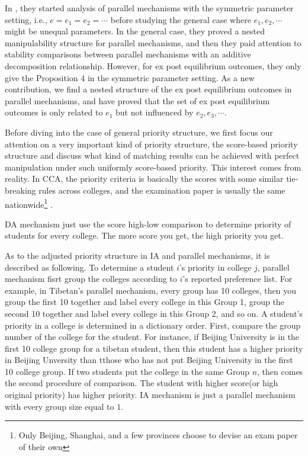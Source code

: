 In \parencite{YanChenJPE}, they started analysis of parallel mechanisms with the symmetric parameter setting, i.e., $e =e_1=e_2=\cdots$ before studying the general case where $e_1, e_2,\cdots$ might be unequal parameters. In the general case, they proved a nested manipulability structure for parallel mechanisms, and then they paid attention to stability comparisons between parallel mechanisms with an additive decomposition relationship. However, for ex post equilibrium outcomes, they only give the Proposition 4 in the symmetric parameter setting. As a new contribution, we find a nested structure of the ex post equilibrium outcomes in parallel mechanisms, and have proved that the set of ex post equilibrium outcomes is only related to $e_1$ but not influenced by $e_2,e_3,\cdots$.   





 Before diving into the case of general priority structure, we first
focus our attention on a very important kind of priority structure,
the score-based priority structure and discuss what kind of matching
results can be achieved with perfect manipulation under such uniformly
score-based priority. This interest comes from reality. In CCA, the priority criteria is basically the scores with some similar tie-breaking rules across colleges, and the examination paper is usually the same nationwide\footnote{Only Beijing, Shanghai, and a few provinces choose to devise an exam paper of their own} .

DA mechanism just use the score high-low comparison to determine
priority of students for every college. The more score you get, the
high priority you get.

As to the adjusted priority structure in IA and parallel mechanisms, it is described as following.
To determine a student $i$'s priority in college $j$, parallel
mechanism fisrt group the colleges according to $i$'s reported
preference list. For example, in Tibetan's parallel mechanism, every
group has 10 colleges, then you group the first 10 together and label
every college in this Group 1, group the second 10 together and label
every college in this Group 2, and so on. A student's priority in a
college is determined in a dictionary order. First, compare the group
number of the college for the student. For instance, if Beijing
University is in the first 10 college group for a tibetan student, 
then this student has a higher priority in Beijing Unversity than
tthose who has not put  Beijing University in the first 10 college
group. If two students put the college in the same Group $n$, then
comes the second procedure of comparison. The student with higher
score(or high original priority) has higher priority. IA mechanism is
just a parallel mechanism with every group size equal to $1$.


